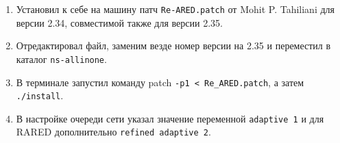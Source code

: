 \begin{enumerate}
\item Установил к себе на машину патч \verb|Re-ARED.patch| от Mohit
  P. Tahiliani для версии 2.34, совместимой также для версии 2.35.
\item Отредактировал файл, заменим везде номер версии на 2.35 и переместил в каталог \verb|ns-allinone|.
\item В терминале запустил команду patch \verb|-p1 < Re_ARED.patch|, а затем  \verb|./install|.
\item В настройке очереди сети указал значение переменной \verb|adaptive 1| и
  для RARED дополнительно \verb|refined adaptive 2|.
\end{enumerate}













